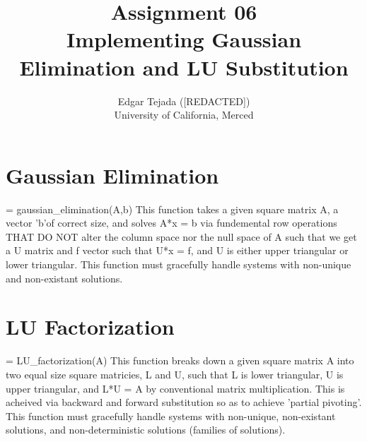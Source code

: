 \documentclass [12pt]{article}
\title{Assignment 06 \\\medskip Implementing Gaussian Elimination and LU Substitution}
\author{Edgar Tejada ([REDACTED])\\University of California, Merced}
\begin{document}
\maketitle

\newpage
\section{Gaussian Elimination}
\indent [U, f] = gaussian_elimination(A,b)
\indent \indent This function takes a given square matrix A, a vector 'b'of correct size, and solves A*x = b via fundemental row operations THAT DO NOT alter the column space nor the null space of A such that we get a U matrix and f vector such that U*x = f, and U is either upper triangular or lower triangular. This function must gracefully handle systems with non-unique and non-existant solutions.

\newpage
\section{LU Factorization}
\indent [L,U] = LU_factorization(A)
\indent \indent  This function breaks down a given square matrix A into two equal size square matricies, L and U, such that L is lower triangular, U is upper triangular, and L*U = A by conventional matrix multiplication. This is acheived via backward and forward substitution so as to achieve 'partial pivoting'. This function must gracefully handle systems with non-unique, non-existant solutions, and non-deterministic solutions (families of solutions).



\nocite{*} 
\printbibliography
\end{document}
